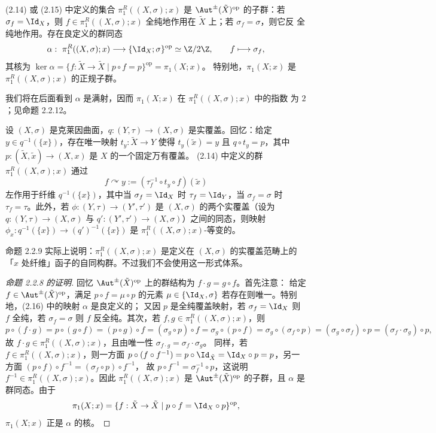 \begin{proposition}\label{prop:2.2.8}
(2.14) 或 (2.15) 中定义的集合 $\pi^R_1((X,\sigma);x)$ 是
$\Aut^{\pm}(\tilde X)^{\mathrm{op}}$ 的子群：若 $\sigma_f=\Id_X$，则
$f\in\pi^R_1((X,\sigma);x)$ 全纯地作用在 $\tilde X$ 上；若 $\sigma_f=\sigma$，则它反
全纯地作用。存在良定义的群同态
\begin{equation}\label{eq:2.16}
\alpha:\ \pi^R_1((X,\sigma);x)\longrightarrow\{\Id_X;\sigma\}^{\mathrm{op}}\simeq\Z/2\Z,
\qquad f\longmapsto\sigma_f,
\end{equation}
其核为 $\ker\alpha=\{f:\tilde X\to\tilde X\mid p\circ f=p\}^{\mathrm{op}}=\pi_1(X;x)$。
特别地，$\pi_1(X;x)$ 是 $\pi^R_1((X,\sigma);x)$ 的正规子群。
\end{proposition}

我们将在后面看到 $\alpha$ 是满射，因而 $\pi_1(X;x)$ 在 $\pi^R_1((X,\sigma);x)$ 中的指数
为 $2$；见命题 2.2.12。

\begin{proposition}\label{prop:2.2.9}
设 $(X,\sigma)$ 是克莱因曲面，$q:(Y,\tau)\to(X,\sigma)$ 是实覆盖。回忆：给定
$y\in q^{-1}(\{x\})$，存在唯一映射 $t_y:\tilde X\to Y$ 使得 $t_y(\tilde x)=y$ 且
$q\circ t_y=p$，其中 $p:(\tilde X,\tilde x)\to(X,x)$ 是 $X$ 的一个固定万有覆盖。
(2.14) 中定义的群 $\pi^R_1((X,\sigma);x)$ 通过
\[
f\curvearrowright y:=(\tau_f^{-1}\circ t_y\circ f)(\tilde x)
\]
左作用于纤维 $q^{-1}(\{x\})$，其中当 $\sigma_f=\Id_X$ 时 $\tau_f=\Id_Y$，当
$\sigma_f=\sigma$ 时 $\tau_f=\tau$。此外，若 $\phi:(Y,\tau)\to(Y',\tau')$ 是
$(X,\sigma)$ 的两个实覆盖（设为 $q:(Y,\tau)\to(X,\sigma)$ 与
$q':(Y',\tau')\to(X,\sigma)$）之间的同态，则映射
$\phi_x:q^{-1}(\{x\})\to(q')^{-1}(\{x\})$ 是 $\pi^R_1((X,\sigma);x)$-等变的。
\end{proposition}

命题 2.2.9 实际上说明：$\pi^R_1((X,\sigma);x)$ 是定义在 $(X,\sigma)$ 的实覆盖范畴上的
「$x$ 处纤维」函子的自同构群。不过我们不会使用这一形式体系。

\begin{proof}[命题 2.2.8 的证明]
回忆 $\Aut^{\pm}(\tilde X)^{\mathrm{op}}$ 上的群结构为 $f\cdot g=g\circ f$。首先注意：
给定 $f\in\Aut^{\pm}(\tilde X)^{\mathrm{op}}$，满足 $p\circ f=\mu\circ p$ 的元素
$\mu\in\{\Id_X,\sigma\}$ 若存在则唯一。特别地，(2.16) 中的映射 $\alpha$ 是良定义的；
又因 $p$ 是全纯覆盖映射，若 $\sigma_f=\Id_X$ 则 $f$ 全纯，若 $\sigma_f=\sigma$ 则 $f$
反全纯。其次，若 $f,g\in\pi^R_1((X,\sigma);x)$，则
\[
p\circ(f\cdot g)=p\circ(g\circ f)=(p\circ g)\circ f
=(\sigma_g\circ p)\circ f=\sigma_g\circ(p\circ f)
=\sigma_g\circ(\sigma_f\circ p)=(\sigma_g\circ\sigma_f)\circ p
=(\sigma_f\cdot\sigma_g)\circ p,
\]
故 $f\cdot g\in\pi^R_1((X,\sigma);x)$，且由唯一性 $\sigma_{f\cdot g}=\sigma_f\cdot\sigma_g$。
同样，若 $f\in\pi^R_1((X,\sigma);x)$，则一方面 $p\circ(f\circ f^{-1})=p\circ\Id_{\tilde X}
=\Id_X\circ p=p$，另一方面 $(p\circ f)\circ f^{-1}=(\sigma_f\circ p)\circ f^{-1}$，
故 $p\circ f^{-1}=\sigma_f^{-1}\circ p$，这说明 $f^{-1}\in\pi^R_1((X,\sigma);x)$。因此
$\pi^R_1((X,\sigma);x)$ 是 $\Aut^{\pm}(\tilde X)^{\mathrm{op}}$ 的子群，且 $\alpha$ 是
群同态。由于
\[
\pi_1(X;x)=\{f:\tilde X\to\tilde X\mid p\circ f=\Id_X\circ p\}^{\mathrm{op}},
\]
$\pi_1(X;x)$ 正是 $\alpha$ 的核。
\end{proof}

